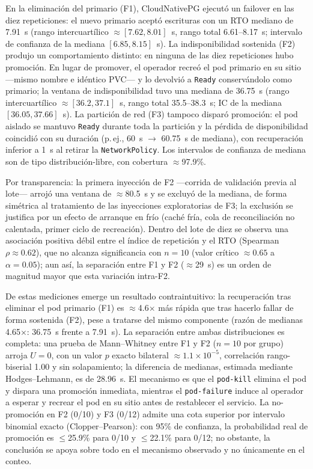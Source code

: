 \documentclass[a4paper]{llncs}
\begin{document}
En la eliminación del primario (F1), CloudNativePG ejecutó un failover en las
diez repeticiones: el nuevo primario aceptó escrituras con un RTO mediano de
7.91~s (rango intercuartílico $\approx[7.62, 8.01]$~s, rango total 6.61--8.17~s;
intervalo de confianza de la mediana $[6.85, 8.15]$~s). La indisponibilidad
sostenida (F2) produjo un comportamiento distinto: en ninguna de las diez
repeticiones hubo promoción. En lugar de promover, el operador recreó el pod
primario en su sitio ---mismo nombre e idéntico PVC--- y lo devolvió a
\texttt{Ready} conservándolo como primario; la ventana de indisponibilidad tuvo
una mediana de 36.75~s (rango intercuartílico $\approx[36.2, 37.1]$~s, rango
total 35.5--38.3~s; IC de la mediana $[36.05, 37.66]$~s). La partición de red
(F3) tampoco disparó promoción: el pod aislado se mantuvo \texttt{Ready} durante
toda la partición y la pérdida de disponibilidad coincidió con su duración
(p.\,ej., 60~s $\to$ 60.75~s de mediana), con recuperación inferior a 1~s al
retirar la \texttt{NetworkPolicy}. Los intervalos de confianza de mediana son de
tipo distribución-libre, con cobertura $\approx$97.9\%.

Por transparencia: la primera inyección de F2 ---corrida de validación previa al
lote--- arrojó una ventana de $\approx$80.5~s y se excluyó de la mediana, de forma
simétrica al tratamiento de las inyecciones exploratorias de F3; la exclusión se
justifica por un efecto de arranque en frío (caché fría, cola de reconciliación no
calentada, primer ciclo de recreación). Dentro del lote de diez se observa una
asociación positiva débil entre el índice de repetición y el RTO (Spearman
$\rho\approx0.62$), que no alcanza significancia con $n=10$ (valor crítico
$\approx0.65$ a $\alpha=0.05$); aun así, la separación entre F1 y F2
($\approx$29~s) es un orden de magnitud mayor que esta variación intra-F2.

De estas mediciones emerge un resultado contraintuitivo: la recuperación tras
eliminar el pod primario (F1) es $\approx$4.6$\times$ más rápida que tras hacerlo
fallar de forma sostenida (F2), pese a tratarse del mismo componente (razón de
medianas 4.65$\times$: 36.75~s frente a 7.91~s). La separación entre ambas
distribuciones es completa: una prueba de Mann--Whitney entre F1 y F2 ($n=10$ por
grupo) arroja $U=0$, con un valor $p$ exacto bilateral $\approx1.1\times10^{-5}$,
correlación rango-biserial 1.00 y sin solapamiento; la diferencia de medianas,
estimada mediante Hodges--Lehmann, es de 28.96~s. El mecanismo es que el
\texttt{pod-kill} elimina el pod y dispara una promoción inmediata, mientras el
\texttt{pod-failure} induce al operador a esperar y recrear el pod en su sitio
antes de restablecer el servicio. La no-promoción en F2 (0/10) y F3 (0/12) admite
una cota superior por intervalo binomial exacto (Clopper--Pearson): con 95\% de
confianza, la probabilidad real de promoción es $\le$25.9\% para 0/10 y
$\le$22.1\% para 0/12; no obstante, la conclusión se apoya sobre todo en el
mecanismo observado y no únicamente en el conteo.
\end{document}
